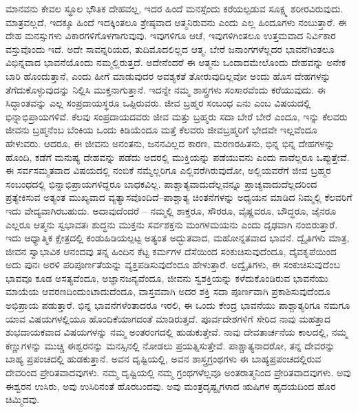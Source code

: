 ಮಾನವನು ಕೇವಲ ಸ್ಥೂಲ ಭೌತಿಕ ದೇಹವಲ್ಲ, ಇದರ ಹಿಂದೆ ಮನಸ್ಸೆಂದು ಕರೆಯಲ್ಪಡುವ ಸೂಕ್ಷ್ಮ ಶರೀರವಿರುವುದು. ಮಾತ್ರವಲ್ಲದೆ, ಇದಕ್ಕೂ ಹಿಂದೆ ಇದಕ್ಕಿಂತಲೂ ಶ್ರೇಷ್ಠವಾದ ಆತ್ಮನಿರುವನು ಎಂದು ಎಲ್ಲ ಹಿಂದೂಗಳು ನಂಬುತ್ತಾರೆ. ಈ ದೇಹ ಮನಸ್ಸುಗಳು ವಿಕಾರಗಳಿಗೊಳಗಾಗುವುವು. ಇವುಗಳಿಗೂ ಆಚೆ, ಇವುಗಳಿಗಿಂತಲೂ ಉತ್ತಮವಾದ ನಿರ್ವಿಕಾರ ವಸ್ತುವೊಂದು ಇದೆ. ಅದೇ ಸಾವನ್ನರಿಯದ, ತುದಿಮೊದಲಿಲ್ಲದ ಆತ್ಮ. ಬೇರೆ ಜನಾಂಗಗಳೆಲ್ಲದರ ಭಾವನೆಗಿಂತಲೂ ವಿಭಿನ್ನವಾದ ಭಾವನೆಯೊಂದು ನಮ್ಮಲ್ಲಿರುತ್ತದೆ. ಅದೇನೆಂದರೆ ಈ ಆತ್ಮನು ಒಂದಾದಮೇಲೊಂದು ದೇಹವನ್ನು ಅನೇಕ ಬಾರಿ ಹೊಂದುತ್ತಾನೆ, ಎಂದು ಹೀಗೆ ಮಾಡುವುದರ ಅವಶ್ಯಕತೆ ತೋರುವುದಿಲ್ಲವೋ ಅಂದು ಹೊಸ ದೇಹಗಳನ್ನು ತೆಗೆದುಕೊಳ್ಳುವುದನ್ನು ನಿಲ್ಲಿಸಿ ಮುಕ್ತನಾಗುತ್ತಾನೆ. ಇದನ್ನೇ ನಮ್ಮ ಶಾಸ್ತ್ರಗಳು ಸಂಸಾರವೆಂದು ಕರೆಯುವುದು. ಈ ಸಿದ್ಧಾಂತವನ್ನು ಎಲ್ಲ ಸಂಪ್ರದಾಯಸ್ಥರೂ ಒಪ್ಪಿರುವರು. ಜೀವ ಬ್ರಹ್ಮರ ಸಂಬಂಧ ಏನು ಎಂಬ ವಿಷಯದಲ್ಲಿ ಭಿನ್ನಾಭಿಪ್ರಾಯಗಳಿವೆ. ಕೆಲವು ಸಂಪ್ರದಾಯದವರು ಜೀವ ಮತ್ತು ಬ್ರಹ್ಮರು ಸದಾ ಬೇರೆ ಬೇರೆ ಎಂದೂ, ಇನ್ನು ಕೆಲವರು ಜೀವನು ಬ್ರಹ್ಮನೆಂಬ ಬೆಂಕಿಯ ಒಂದು ಕಿಡಿಯೆಂದೂ ಮತ್ತೆ ಕೆಲವರು ಜೀವಬ್ರಹ್ಮರಿಗೆ ಭೇದವೇ ಇಲ್ಲವೆಂದೂ ಹೇಳುವರು. ಆದರೂ, ಈ ಜೀವನು ಅನಂತನು, ಜನನವಿಲ್ಲದ ಕಾರಣ, ಮರಣರಹಿತನು, ಭಿನ್ನ ಭಿನ್ನ ದೇಹಗಳನ್ನು ಹೊಂದಿ, ಕಡೆಗೆ ಮನುಷ್ಯ ದೇಹವನ್ನು ಪಡೆದು ಅದರಲ್ಲಿ ಮುಕ್ತಿಯನ್ನು ಪಡೆಯುವನು ಎಂದು ನಾವೆಲ್ಲರೂ ಒಪ್ಪುತ್ತೇವೆ. ಈ ಸರ್ವಸಮ್ಮತವಾದ ವಿಷಯದಲ್ಲಿ ನಂಬಿಕೆ ನಮ್ಮೆಲ್ಲರಿಗೂ ಎಲ್ಲಿವರೆಗಿರುವುದೋ, ಅಲ್ಲಿಯವರೆಗೆ ಜೀವ ಬ್ರಹ್ಮರ ಸಂಬಂಧದಲ್ಲಿ ಭಿನ್ನಾಭಿಪ್ರಾಯಗಳಿದ್ದರೂ ಬಾಧಕವಿಲ್ಲ. ಪಾಶ್ಚಾತ್ಯವಾದುದೆಲ್ಲವನ್ನೂ ಪ್ರಾಚ್ಯವಾದುದೆಲ್ಲದರಿಂದ ಪ್ರತ್ಯೇಕಿಸುವ ಅತ್ಯಂತ ಮುಖ್ಯವಾದ ವ್ಯತ್ಯಾಸವೊಂದಿದೆ–ಪಾಶ್ಚಾತ್ಯ ಚಿಂತನೆಗಳನ್ನು ಅಧ್ಯಯನ ಮಾಡಿದ ನಿಮ್ಮಲ್ಲಿ ಕೆಲವರಿಗೆ ಇದು ವೇದ್ಯವಾಗಿರಬಹುದು. ಅದಾವುದೆಂದರೆ – ನಮ್ಮಲ್ಲಿ ಶಾಕ್ತರೂ, ಸೌರರೂ, ವೈಷ್ಣವರೂ, ಬೌದ್ಧರೂ, ಜೈನರೂ ಎಲ್ಲರೂ ಆತ್ಮನು ಸ್ವಭಾವತಃ ಶುದ್ಧನು ಮುಕ್ತನು ಸರ್ವಶಕ್ತನು ಮಂಗಳಮಯನು ಎಂದು ದೃಢವಾಗಿ ನಂಬಿರುತ್ತಾರೆ. ಇದು ಆಧ್ಯಾತ್ಮಿಕ ಕ್ಷೇತ್ರದಲ್ಲಿ ಕಂಡುಹಿಡಿಯಲ್ಪಟ್ಟ ಅತ್ಯಂತ ಅದ್ಭುತವಾದ, ಮಹೋನ್ನತವಾದ ಭಾವನೆ. ದ್ವೈತಿಗಳು ಮಾತ್ರ, ಜೀವನ ಸ್ವಾಭಾವಿಕ ಆನಂದವು ತನ್ನ ಹಿಂದಿನ ಕೆಟ್ಟ ಕರ್ಮಗಳ ದೆಸೆಯಿಂದ ಸಂಕುಚಿಸುವುದೆಂದೂ, ದೈವಕೃಪೆಯಿಂದ ಅದು ಪುನಃ ಅರಳಿ ಪರಿಪೂರ್ಣತೆಯನ್ನು ವ್ಯಕ್ತಪಡಿಸುವುದೆಂದೂ ಹೇಳುತ್ತಾರೆ. ಅದ್ವೈತಿಗಳು, ಈ ಸಂಕುಚಿಸುವುದೆಂಬ ಭಾವವೂ ಕೂಡ ಅಸತ್ಯವೆಂದೂ, ಅಜ್ಞಾನಜನ್ಯವೆಂದೂ, ಜೀವನು ಸ್ವಶಕ್ತಿಯನ್ನು ಕಳೆದುಕೊಂಡಿರುವ ಭಾವನೆಯು ಮಾಯೆಯ ಆವರಣದಿಂದುಂಟಾದುದೆಂದೂ, ವಾಸ್ತವವಾಗಿ ಅದರ ಶಕ್ತಿ ಸದಾ ಪೂರ್ಣವಾಗಿ ಪ್ರಕಾಶಿಸುವುದೆಂದೂ ಅಭಿಪ್ರಾಯ ಪಡುತ್ತಾರೆ. ಭಿನ್ನ ಭಾವನೆಗಳೆಂತಾದರೂ ಇರಲಿ, ಈ ಒಂದು ಕೇಂದ್ರ ಭಾವನೆಯು ಪಾಶ್ಚಾತ್ಯರಿಗೂ ನಮಗೂ ಯಾವ ವಿಷಯಗಳಲ್ಲಿಯೂ ಹೊಂದಿಕೆಯಾಗದಂತೆ ಮಾಡಿರುತ್ತದೆ. ಪೂರ್ವದೇಶಗಳಿಗೆ ಸೇರಿದ ನಾವು ಮಹತ್ತಾದ ಶುಭದಾಯಕವಾದ ವಿಷಯಗಳನ್ನು ನಮ್ಮ ಅಂತರಂಗದಲ್ಲಿ ಹುಡುಕುತ್ತೇವೆ. ನಾವು ದೇವತಾರ್ಚನೆಯ ಕಾಲದಲ್ಲಿ, ನಮ್ಮ ಕಣ್ಣುಗಳನ್ನು ಮುಚ್ಚಿ ಈಶ್ವರನನ್ನು ಮನಸ್ಸಿನಲ್ಲಿ ನೋಡಲು ಪ್ರಯತ್ನಿಸುತ್ತೇವೆ. ಪಾಶ್ಚಾತ್ಯನಾದರೋ, ತನ್ನ ದೇವರನ್ನು ಬಾಹ್ಯ ಪ್ರಪಂಚದಲ್ಲಿ ಹುಡಕುತ್ತಾನೆ. ಅವನ ದೃಷ್ಟಿಯಲ್ಲಿ, ಅವನ ಶಾಸ್ತ್ರಗ್ರಂಥಗಳು ಈ ಬಾಹ್ಯಪ್ರಪಂಚದಲ್ಲಿರುವ ದೇವರಿಂದ ಪ್ರೇರಿತವಾದವುಗಳು. ನಮ್ಮ ದೃಷ್ಟಿಯಲ್ಲಿ ನಮ್ಮ ಗ್ರಂಥಗಳೆಲ್ಲವೂ ಅಂತರಾತ್ಮನಿಂದ ಪ್ರೇರಿತವಾದವುಗಳು. ಅವು ಈಶ್ವರನ ಉಸಿರು, ಅವು ಉಸಿರಿನಂತೆ ಹೊರಬಂದವು. ಅವು ಮಂತ್ರದೃಷ್ಟೃಗಳಾದ ಋಷಿಗಳ ಹೃದಯದಿಂದ ಹೊರ ಚಿಮ್ಮಿದವು.

\vskip 3pt

